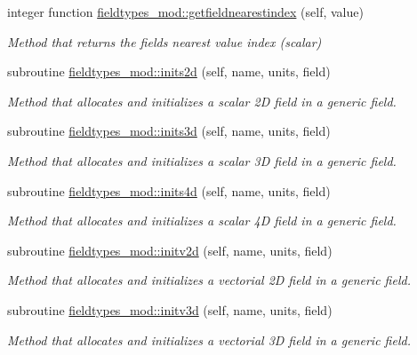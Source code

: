 \begin{DoxyCompactItemize}
integer function \mbox{\hyperlink{namespacefieldtypes__mod_afad53b4aed8733a243672c2dc19f62f3}{fieldtypes\+\_\+mod\+::getfieldnearestindex}} (self, value)
\begin{DoxyCompactList}\small\item\em Method that returns the field\textquotesingle{}s nearest value index (scalar) \end{DoxyCompactList}\item 
subroutine \mbox{\hyperlink{namespacefieldtypes__mod_ad3329e97ec60bf9226d19be45ed21859}{fieldtypes\+\_\+mod\+::inits2d}} (self, name, units, field)
\begin{DoxyCompactList}\small\item\em Method that allocates and initializes a scalar 2D field in a generic field. \end{DoxyCompactList}\item 
subroutine \mbox{\hyperlink{namespacefieldtypes__mod_a750ce2c729d98ea7031c839a3a5ebd7c}{fieldtypes\+\_\+mod\+::inits3d}} (self, name, units, field)
\begin{DoxyCompactList}\small\item\em Method that allocates and initializes a scalar 3D field in a generic field. \end{DoxyCompactList}\item 
subroutine \mbox{\hyperlink{namespacefieldtypes__mod_a1987bd94293cfd9e35016ac5992501cd}{fieldtypes\+\_\+mod\+::inits4d}} (self, name, units, field)
\begin{DoxyCompactList}\small\item\em Method that allocates and initializes a scalar 4D field in a generic field. \end{DoxyCompactList}\item 
subroutine \mbox{\hyperlink{namespacefieldtypes__mod_ad1af664e23793260f9c2fcd03829a1f5}{fieldtypes\+\_\+mod\+::initv2d}} (self, name, units, field)
\begin{DoxyCompactList}\small\item\em Method that allocates and initializes a vectorial 2D field in a generic field. \end{DoxyCompactList}\item 
subroutine \mbox{\hyperlink{namespacefieldtypes__mod_aa0a152c9e5131d3003cc34e4f3b2974d}{fieldtypes\+\_\+mod\+::initv3d}} (self, name, units, field)
\begin{DoxyCompactList}\small\item\em Method that allocates and initializes a vectorial 3D field in a generic field. \end{DoxyCompactList}\item 

\end{DoxyCompactItemize}
